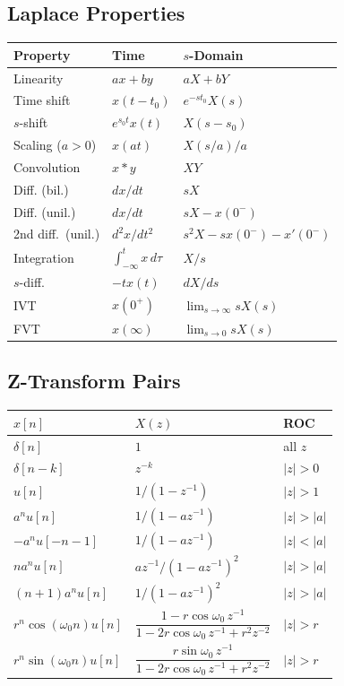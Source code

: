 \documentclass[11pt]{article}
\begin{document}
\subsection{Laplace Properties}
\begin{center}
\begin{tabular}{|l|l|l|}
\hline
Property & Time & $s$-Domain\\
\hline
Linearity & $ax+by$ & $aX+bY$\\
Time shift & $x(t-t_0)$ & $e^{-st_0}X(s)$\\
$s$-shift & $e^{s_0 t}x(t)$ & $X(s-s_0)$\\
Scaling ($a>0$) & $x(at)$ & $X(s/a)/a$\\
Convolution & $x*y$ & $XY$\\
Diff. (bil.) & $dx/dt$ & $sX$\\
Diff. (unil.) & $dx/dt$ & $sX - x(0^-)$\\
2nd diff.\ (unil.) & $d^2x/dt^2$ & $s^2 X - sx(0^-)-x'(0^-)$\\
Integration & $\int_{-\infty}^t x\,d\tau$ & $X/s$\\
$s$-diff. & $-tx(t)$ & $dX/ds$\\
IVT & $x(0^+)$ & $\lim_{s\to\infty}sX(s)$\\
FVT & $x(\infty)$ & $\lim_{s\to 0}sX(s)$\\
\hline
\end{tabular}
\end{center}

\subsection{Z-Transform Pairs}
\begin{center}
\begin{tabular}{|l|l|l|}
\hline
$x[n]$ & $X(z)$ & ROC\\
\hline
$\delta[n]$ & $1$ & all $z$\\
$\delta[n-k]$ & $z^{-k}$ & $|z|>0$\\
$u[n]$ & $1/(1-z^{-1})$ & $|z|>1$\\
$a^n u[n]$ & $1/(1-az^{-1})$ & $|z|>|a|$\\
$-a^n u[-n-1]$ & $1/(1-az^{-1})$ & $|z|<|a|$\\
$na^n u[n]$ & $az^{-1}/(1-az^{-1})^2$ & $|z|>|a|$\\
$(n+1)a^n u[n]$ & $1/(1-az^{-1})^2$ & $|z|>|a|$\\
$r^n\cos(\omega_0 n)u[n]$ & $\dfrac{1-r\cos\omega_0\, z^{-1}}{1-2r\cos\omega_0\, z^{-1}+r^2 z^{-2}}$ & $|z|>r$\\
$r^n\sin(\omega_0 n)u[n]$ & $\dfrac{r\sin\omega_0\, z^{-1}}{1-2r\cos\omega_0\, z^{-1}+r^2 z^{-2}}$ & $|z|>r$\\
\hline
\end{tabular}
\end{center}
\end{document}
